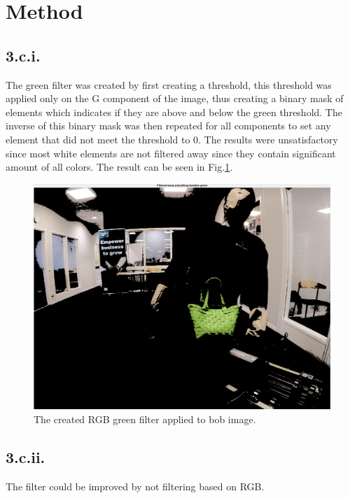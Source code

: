 \section{Method}

\subsection{3.c.i.}
The green filter was created by first creating a threshold, this threshold was applied only on the G component of the image, thus creating a binary mask of elements which indicates if they are above and below the green threshold. The inverse of this binary mask was then repeated for all components to set any element that did not meet the threshold to 0. 
The results were unsatisfactory since most white elements are not filtered away since they contain significant amount of all colors. The result can be seen in Fig.\:\ref{fig:green_filter}.
\begin{figure}
    \centering
    \includegraphics[width=\columnwidth]{images/green_filter.png}
    \caption{The created RGB green filter applied to bob image.}
    \label{fig:green_filter}
\end{figure}

\subsection{3.c.ii.}
The filter could be improved by not filtering based on RGB.


